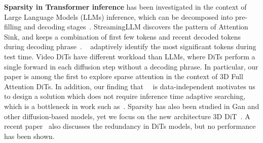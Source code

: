 \textbf{Sparsity in Transformer inference} has been investigated in the context of Large Language Models (LLMs) inference, which can be decomposed into pre-filling and decoding stages~\citep{yu2022orca}. StreamingLLM discovers the pattern of Attention Sink, and keeps a combination of first few tokens and recent decoded tokens during decoding phrase~\citep{xiao2023efficient}. ~\citet{zhang2024q, zhang2024h2o} adaptively identify the most significant tokens during test time. Video DiTs have different workload than LLMs, where DiTs perform a single forward in each diffusion step without a decoding phrase. In particular, our paper is among the first to explore sparse attention in the context of 3D Full Attention DiTs. In addition, our finding that ~\patternname~is data-independent motivates us to design a solution which does not require inference time adaptive searching, which is a bottleneck in work such as~\citet{zhang2024h2o}. Sparsity has also been studied in Gan and other diffusion-based models, yet we focus on the new architecture 3D DiT~\citep{li2020gan, li2022efficient}. A recent paper~\citep{wang2024qihoo} also discusses the redundancy in DiTs models, but no performance has been shown.%





